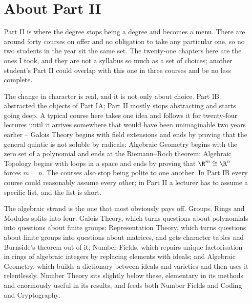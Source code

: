 {}
\section*{About Part II}

Part II is where the degree stops being a degree and becomes a menu. There are around
forty courses on offer and no obligation to take any particular one, so no two students
in the year sit the same set. The twenty-one chapters here are the ones I took, and
they are not a syllabus so much as a set of choices; another student's Part II could
overlap with this one in three courses and be no less complete.

The change in character is real, and it is not only about choice. Part IB abstracted
the objects of Part IA; Part II mostly stops abstracting and starts going deep. A
typical course here takes one idea and follows it for twenty-four lectures until it
arrives somewhere that would have been unimaginable two years earlier -- Galois Theory
begins with field extensions and ends by proving that the general quintic is not
soluble by radicals; Algebraic Geometry begins with the zero set of a polynomial and
ends at the Riemann--Roch theorem; Algebraic Topology begins with loops in a space and
ends by proving that $\R^m \cong \R^n$ forces $m = n$. The courses also stop being
polite to one another. In Part IB every course could reasonably assume every other; in
Part II a lecturer has to assume a specific list, and the list is short.

The algebraic strand is the one that most obviously pays off. Groups, Rings and Modules
splits into four: Galois Theory, which turns questions about polynomials into questions
about finite groups; Representation Theory, which turns questions about finite groups
into questions about matrices, and gets character tables and Burnside's theorem out of
it; Number Fields, which repairs unique factorisation in rings of algebraic integers by
replacing elements with ideals; and Algebraic Geometry, which builds a dictionary
between ideals and varieties and then uses it relentlessly. Number Theory sits slightly
below these, elementary in its methods and enormously useful in its results, and feeds
both Number Fields and Coding and Cryptography.


